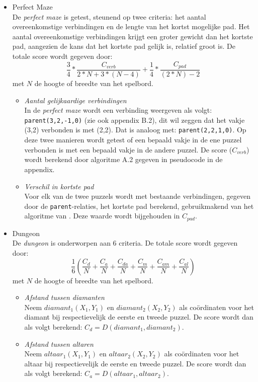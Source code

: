 \documentclass{article}
\begin{document}
\begin{itemize}
\begin{itemize}
\end{itemize}
\item Perfect Maze\\
De \textit{perfect maze} is getest, steunend op twee criteria: het aantal overeenkomstige verbindingen en de lengte van het kortst mogelijke pad. Het aantal overeenkomstige verbindingen krijgt een groter gewicht dan het kortste pad, aangezien de kans dat het kortste pad gelijk is, relatief groot is. De totale score wordt gegeven door:
$$\frac{3}{4}*\frac{C_{verb}}{2*N + 3*(N-4)} + \frac{1}{4}*\frac{C_{pad}}{(2*N)-2}$$ met $N$ de hoogte of breedte van het spelbord.
\begin{itemize}
\item \textit{Aantal gelijkaardige verbindingen}\\
In de \textit{perfect maze} wordt een verbinding weergeven als volgt: \texttt{parent(3,2,-1,0)} (zie ook appendix B.2), dit wil zeggen dat het vakje (3,2) verbonden is met (2,2). Dat is analoog met: \texttt{parent(2,2,1,0)}. Op deze twee manieren wordt getest of een bepaald vakje in de ene puzzel verbonden is met een bepaald vakje in de andere puzzel. De score ($C_{verb}$) wordt berekend door algoritme A.2 gegeven in pseudocode in de appendix.
\item \textit{Verschil in kortste pad}\\
Voor elk van de twee puzzels wordt met bestaande verbindingen, gegeven door de \texttt{parent}-relaties, het kortste pad berekend, gebruikmakend van het algoritme van \cite{Dijkstra1959}. Deze waarde wordt bijgehouden in $C_{pad}$.
\end{itemize}
\item Dungeon\\
De \textit{dungeon} is onderworpen aan 6 criteria. De totale score wordt gegeven door: $$\frac{1}{6}\left(\frac{C_{d}}{N} + \frac{C_{a}}{N} + \frac{C_{da}}{N} + \frac{C_{m}}{N} + \frac{C_{am}}{N}+ \frac{C_{al}}{N}\right)$$ met $N$ de hoogte of breedte van het spelbord.
\begin{itemize}
\item \textit{Afstand tussen diamanten}\\
Neem $diamant_1(X_1, Y_1)$ en $diamant_2(X_2, Y_2)$ als co\"ordinaten voor het diamant bij respectievelijk de eerste en tweede puzzel. De score wordt dan als volgt berekend: $C_{d} = D(diamant_1, diamant_2)$.
\item \textit{Afstand tussen altaren}\\
Neem $altaar_1(X_1, Y_1)$ en $altaar_2(X_2, Y_2)$ als co\"ordinaten voor het altaar bij respectievelijk de eerste en tweede puzzel. De score wordt dan als volgt berekend: $C_{a} = D(altaar_1, altaar_2)$.


\end{itemize}
\end{itemize}
\end{document}
